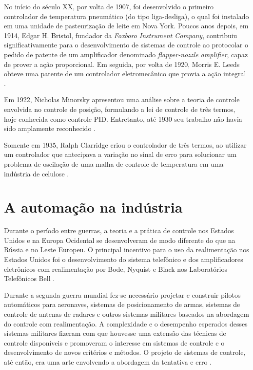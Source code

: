 No início do século XX, por volta de 1907, foi desenvolvido o primeiro
controlador de temperatura pneumático (do tipo liga-desliga), o qual foi
instalado em uma unidade de pasteurização de leite em Nova York. Poucos anos
depois, em 1914, Edgar H. Bristol, fundador da {\it Foxboro Instrument Company},
contribuiu significativamente para o desenvolvimento de sistemas de controle ao
protocolar o pedido de patente de um amplificador denominado {\it flapper-nozzle
amplifier}, capaz de prover a ação proporcional. Em seguida, por volta de 1920,
Morris E. Leeds obteve uma patente de um controlador eletromecânico que provia a
ação integral \cite{faccin:2004}.

Em 1922, Nicholas Minorsky apresentou uma análise sobre a teoria de controle
envolvida no controle de posição, formulando a lei de controle de três termos,
hoje conhecida como controle PID.  Entretanto, até 1930 seu trabalho não havia
sido amplamente reconhecido \cite{bennett:1996}.

Somente em 1935, Ralph Clarridge criou o controlador de três termos, ao utilizar
um controlador que antecipava a variação no sinal de erro para solucionar um
problema de oscilação de uma malha de controle de temperatura em uma indústria
de celulose \cite{faccin:2004}.

\section{A automação na indústria}
Durante o período entre guerras, a teoria e a prática de controle nos Estados
Unidos e na Europa Ocidental se desenvolveram de modo diferente do que na Rússia
e no Leste Europeu. O principal incentivo para o uso da realimentação nos
Estados Unidos foi o desenvolvimento do sistema telefônico e dos amplificadores
eletrônicos com realimentação por Bode, Nyquist e Black nos Laboratórios
Telefônicos Bell \cite{dorf:2009}.

Durante a segunda guerra mundial fez-se necessário projetar e construir pilotos
automáticos para aeronaves, sistemas de posicionamento de armas, sistemas de
controle de antenas de radares e outros sistemas militares baseados na abordagem
do controle com realimentação. A complexidade e o desempenho esperados desses
sistemas militares fizeram com que houvesse uma extensão das técnicas de
controle disponíveis e promoveram o interesse em sistemas de controle e o
desenvolvimento de novos critérios e métodos. O projeto de sistemas de controle,
até então, era uma arte envolvendo a abordagem da tentativa e erro
\cite{dorf:2009}.

